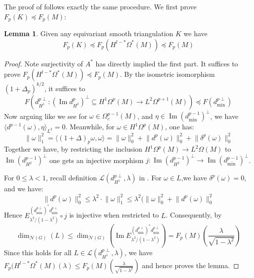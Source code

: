 \documentclass[11pt]{report}
\theoremstyle{definition}
\newtheorem{Lemma}[Def]{Lemma}
\theoremstyle{plain}
\DeclareMathOperator{\im}{Im}
\newcommand{\vna}{\mathcal{N}}
\newcommand{\brac}[1]{\langle #1 \rangle}
\newcommand{\norm}[1]{\lVert #1 \rVert}
\begin{document}
The proof of  follows exactly the same procedure. We first prove $F_p(K)\preceq F_p(M)$:
\begin{Lemma}
	Given any equivariant smooth triangulation $K$ we have 
	\begin{equation*}
	F_p(K)\preceq F_p(H^{l-*}\Omega^*(M))\preceq F_p(M)
	\end{equation*}
\end{Lemma}
\begin{proof}
	Note surjectivity of $A^*$ has directly implied the first part. It suffices to prove $F_p(H^{l-*}\Omega^*(M))\preceq F_p(M)$. By the isometric isomorphism $(1+\Delta_p)^{k/2}$, it suffices to 
	\begin{equation}
	F(d^{p\perp}_{H^1}:(\im d^p_{H^2})^\perp \subseteq H^{1}\Omega^p(M)\to L^2\Omega^{p+1}(M))\preceq F(d^{p\perp}_{\min})
	\end{equation}
	Now arguing like  we see for $\omega\in \Omega^{p-1}_c(M)$, and $\eta\in \im(d^{p-1}_{\min})^\perp$, we have $\brac{d^{p-1}(\omega), \eta}_{L^2}=0$. Meanwhile, for $\omega\in H^1\Omega^p(M)$, one has:
	\begin{equation}
	\norm{\omega}_1^2=\brac{(1+\Delta)_p\omega, \omega}=\norm{\omega}^2_0+\norm{d^p(\omega)}^2_0+\norm{\delta^p(\omega)}_0^2
	\end{equation}
	Together we have, by restricting the inclusion $H^1\Omega^p(M)\to L^2\Omega(M)$ to $\im(d^{p-1}_{H^2})^\perp$ one gets an injective morphism $j:\im(d^{p-1}_{H^2})^\perp\to \im(d^{p-1}_{\min})^\perp$.
	\par For $0\leq \lambda<1$, recall definition $\mathcal{L}(d^{p\perp}_{H^1}, \lambda)$ in . For $\omega\in L$,we have $\delta^p(\omega)=0$, and we have:
	\begin{equation*}
	\norm{d^p(\omega)}^2_0\leq \lambda^2\cdot \norm{\omega}^2_1\leq \lambda^2(\norm{\omega}^2_0+\norm{d^p(\omega)}^2_0
	\end{equation*}
	Hence $E^{(d^{p\perp}_{\min})^*d^{p\perp}_{\min}}_{\lambda^2/(1-\lambda^2)}\circ j$ is injective when restricted to $L$. Consequently, by 
	\begin{equation*}
		\dim_{\vna(G)}(L)\leq \dim_{\vna(G)}(\im E^{(d^{p\perp}_{\min})^*d^{p\perp}_{\min}}_{\lambda^2/(1-\lambda^2)})=F_p(M)(\frac{\lambda}{\sqrt{1-\lambda^2}})
	\end{equation*}
	Since this holds for all $L\in \mathcal{L}(d^{p\perp}_{H^1}, \lambda)$, we have $F_p(H^{l-*}\Omega^*(M)(\lambda)\leq F_p(M)(\frac{\lambda}{\sqrt{1-\lambda^2}})$ and hence proves the lemma.
\end{proof}
\end{document}
